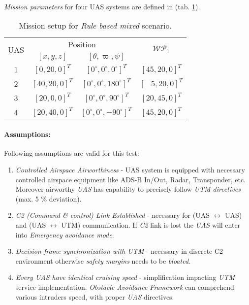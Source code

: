 \noindent\emph{Mission parameters} for four UAS systems are defined in (tab. \ref{tab:missionSetupRuleBasedMixedScenario}).

\begin{table}[H]
	\centering
	\begin{tabular}{c||c|c||c}
		\multirow{2}{*}{UAS} &\multicolumn{2}{c||}{Position} & \multirow{2}{*}{$\mathscr{WP}_1$} \\\cline{2-3}
		  & $[x,y,z]$           & $[\theta,\varpi,\psi]$           & \\\hline\hline
		1 & $[0,20,0]^T $       & $[0^\circ,0^\circ,0^\circ]^T$    & $[45,20,0]^T$\\\hline 
		2 & $[40,20,0]^T $       & $[0^\circ,0^\circ,180^\circ]^T$    & $[-5,20,0]^T$\\\hline 
		3 & $[20,0,0]^T $       & $[0^\circ,0^\circ,90^\circ]^T$    & $[20,45,0]^T$\\\hline 
		4 & $[20,40,0]^T $       & $[0^\circ,0^\circ,-90^\circ]^T$  & $[45,20,0]^T$\\ 
	\end{tabular}
	\caption{Mission setup for \emph{Rule based mixed} scenario.}
	\label{tab:missionSetupRuleBasedMixedScenario}
\end{table}

\paragraph{Assumptions:} Following assumptions are valid for this test:

\begin{enumerate}
	\item \emph{Controlled Airspace Airworthiness} - UAS system is equipped with necessary controlled airspace equipment like ADS-B In/Out, Radar, Transponder, etc. Moreover airworthy \emph{UAS} has capability to precisely follow \emph{UTM directives} (max. 5 $\%$ deviation).
	
	\item \emph{C2 (Command \& control) Link Established} - necessary for (UAS $\leftrightarrow$ UAS) and (UAS $\leftrightarrow$ UTM) communication. If \emph{C2} link is lost the \emph{UAS} will enter into \emph{Emergency avoidance mode}.
	
	\item \emph{Decision frame synchronization with UTM} - necessary in discrete C2 environment otherwise \emph{safety margins} needs to be \emph{bloated}.
	
	\item \emph{Every UAS have identical cruising speed} - simplification impacting \emph{UTM} service implementation. \emph{Obstacle Avoidance Framework} can comprehend various intruders speed, with proper \emph{UAS} directives.
\end{enumerate}

